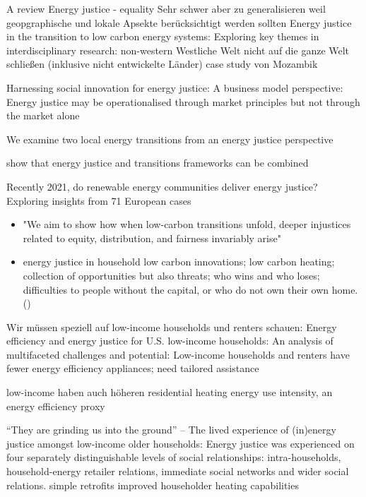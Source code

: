 A review Energy justice - equality \cite{pellegrini2020energy}
Sehr schwer aber zu generalisieren weil geopgraphische und lokale Apsekte berücksichtigt werden sollten
Energy justice in the transition to low carbon energy systems: Exploring key themes in interdisciplinary research: non-western 
Westliche Welt nicht auf die ganze Welt schließen (inklusive nicht entwickelte Länder) \cite{broto2018energy} case study von Mozambik

Harnessing social innovation for energy justice: A business model perspective: Energy justice may be operationalised through market principles but not through the market alone \cite{hiteva2017harnessing}

We examine two local energy transitions from an energy justice perspective \cite{mundaca2018successful}

show that energy justice and transitions frameworks can be combined \cite{jenkins2018humanizing}

Recently 2021, do renewable energy communities deliver energy justice? Exploring insights from 71 European cases \cite{hanke2021renewable}

\begin{itemize}
	\item "We aim to show how when low-carbon transitions unfold, deeper injustices related to equity, distribution, and fairness invariably arise" \cite{sovacool2019decarbonization}
	\item energy justice in household low carbon innovations; low carbon heating; collection of opportunities but also threats; who wins and who loses; difficulties to people without the capital, or who do not own their own home. (\cite{sovacool2019temporality})
\end{itemize}

Wir müssen speziell auf low-income households und renters schauen: Energy efficiency and energy justice for U.S. low-income households: An analysis of multifaceted challenges and potential: Low-income households and renters have fewer energy efficiency appliances; need tailored assistance \cite{xu2019energy}

low-income haben auch höheren residential heating energy use intensity, an energy efficiency proxy \cite{reames2016targeting}

“They are grinding us into the ground” – The lived experience of (in)energy justice amongst low-income older households: Energy justice was experienced on four separately distinguishable levels of social relationships: intra-households, household-energy retailer relations, immediate social networks and wider social relations. simple retrofits improved householder heating capabilities \cite{willand2018they}


